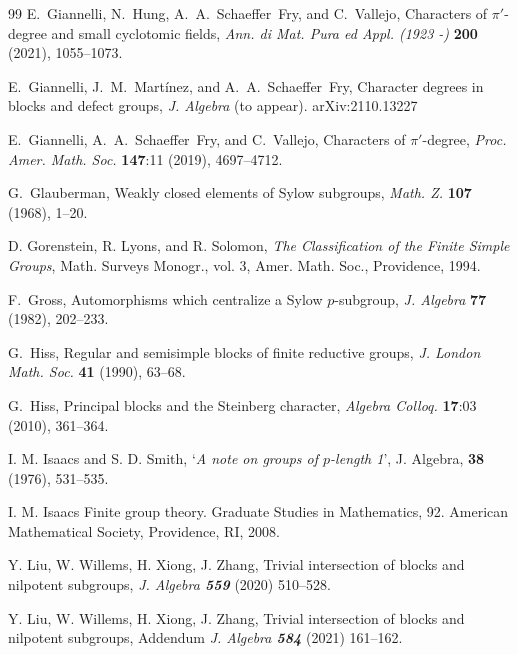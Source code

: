 \documentclass[12pt,leqno,a4paper]{amsart}
\theoremstyle{remark}
\begin{document}
\begin{thebibliography}{99}
{\sc E.~Giannelli, N.~Hung,  A.~A.~Schaeffer~Fry, and C.~Vallejo}, Characters of $\pi '$-degree and small cyclotomic fields, \emph{Ann. di Mat. Pura ed Appl. (1923 -)}  \textbf{200} (2021), 1055--1073.

{\sc E.~Giannelli, J.~M.~Mart{\'i}nez, and A.~A.~Schaeffer~Fry}, Character degrees in blocks and defect groups, \emph{J. Algebra} (to appear). {arXiv:2110.13227}



{\sc E.~Giannelli, A.~A.~Schaeffer~Fry, and  C.~Vallejo}, Characters of $\pi'$-degree, \emph{Proc. Amer. Math. Soc.} \textbf{147}:11 (2019),  4697--4712.

{\sc G.~Glauberman}, Weakly closed elements of Sylow subgroups, \emph{Math. Z.} \textbf{107} (1968), 1--20.

{\sc D. Gorenstein, R. Lyons, and R. Solomon}, \emph{The
Classification of the Finite Simple Groups}, Math. Surveys Monogr.,
vol. 3, Amer. Math. Soc., Providence, 1994.


{\sc F.~Gross}, Automorphisms which centralize a Sylow $p$-subgroup, \emph{J. Algebra} \textbf{77} (1982), 202--233. 

{\sc G.~Hiss}, Regular and semisimple blocks of finite reductive groups, \emph{J. London Math. Soc.} \textbf{41} (1990), 63--68.

{\sc G.~Hiss}, Principal blocks and the Steinberg character, \emph{Algebra Colloq.} \textbf{17}:03 (2010), 361--364.

 {\sc I. M. Isaacs and S. D. Smith,} `{\it A note on groups of $p$-length 1}', J. Algebra, {\bf 38} (1976),   531--535.
 
 {\sc I. M. Isaacs}  Finite group theory.  Graduate Studies in Mathematics, 92. American Mathematical Society, Providence, RI, 2008.

 

{\sc Y. Liu, W. Willems,
H. Xiong, J. Zhang},
 Trivial intersection of blocks and nilpotent subgroups,
\emph{J. Algebra \bf 559} (2020) 510--528.


{\sc Y. Liu, W. Willems,
H. Xiong, J. Zhang},
 Trivial intersection of blocks and nilpotent subgroups, Addendum
\emph{J. Algebra \bf 584} (2021) 161--162.




\end{thebibliography}
\end{document}
